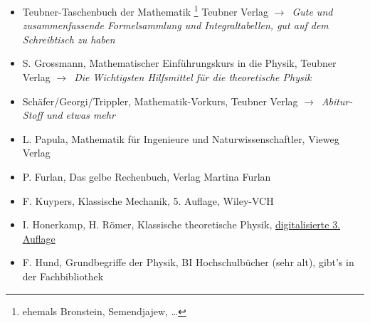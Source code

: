 \documentclass[oneside]{book}
\theoremstyle{definition}
\newcommand{\conseq}{$\rightarrow$~}
\begin{document}
\begin{itemize}
	\item Teubner-Taschenbuch der Mathematik \footnote{ehemals Bronstein, Semendjajew, \dots} Teubner Verlag \conseq \textit{Gute und zusammenfassende Formelsammlung und Integraltabellen, gut auf dem Schreibtisch zu haben}
	\item S. Grossmann, Mathematischer Einführungskurs in die Physik, Teubner Verlag \conseq \textit{Die Wichtigsten Hilfsmittel für die theoretische Physik}
	\item Schäfer/Georgi/Trippler, Mathematik-Vorkurs, Teubner Verlag \conseq \textit{Abitur-Stoff und etwas mehr}
	\item L. Papula, Mathematik für Ingenieure und Naturwissenschaftler, Vieweg Verlag
	\item P. Furlan, Das gelbe Rechenbuch, Verlag Martina Furlan
	\item F. Kuypers, Klassische Mechanik, 5. Auflage, Wiley-VCH
	\item I. Honerkamp, H. Römer, Klassische theoretische Physik, \href{http://www.freidok.uni-freiburg.de/volltexte/82/}{digitalisierte 3. Auflage}
	\item F. Hund, Grundbegriffe der Physik, BI Hochschulbücher (sehr alt), gibt's in der Fachbibliothek
\end{itemize}
\end{document}
